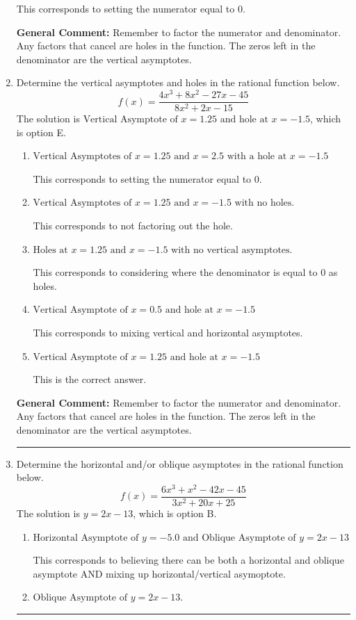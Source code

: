 \documentclass{extbook}[14pt]
\newcommand{\litem}[1]{\item #1

\rule{\textwidth}{0.4pt}}
\begin{document}
\begin{enumerate}
{\begin{enumerate}[label=\Alph*.]
This corresponds to setting the numerator equal to 0.
\end{enumerate}

\textbf{General Comment:} Remember to factor the numerator and denominator. Any factors that cancel are holes in the function. The zeros left in the denominator are the vertical asymptotes.
}
\litem{
Determine the vertical asymptotes and holes in the rational function below.
\[ f(x) = \frac{4x^{3} +8 x^{2} -27 x -45}{8x^{2} +2 x -15} \]The solution is \( \text{Vertical Asymptote of } x = 1.25 \text{ and hole at } x = -1.5 \), which is option E.\begin{enumerate}[label=\Alph*.]
\item \( \text{Vertical Asymptotes of } x = 1.25 \text{ and } x = 2.5 \text{ with a hole at } x = -1.5 \)

This corresponds to setting the numerator equal to 0.
\item \( \text{Vertical Asymptotes of } x = 1.25 \text{ and } x = -1.5 \text{ with no holes.} \)

This corresponds to not factoring out the hole.
\item \( \text{Holes at } x = 1.25 \text{ and } x = -1.5 \text{ with no vertical asymptotes.} \)

This corresponds to considering where the denominator is equal to 0 as holes.
\item \( \text{Vertical Asymptote of } x = 0.5 \text{ and hole at } x = -1.5 \)

This corresponds to mixing vertical and horizontal asymptotes.
\item \( \text{Vertical Asymptote of } x = 1.25 \text{ and hole at } x = -1.5 \)

This is the correct answer.
\end{enumerate}

\textbf{General Comment:} Remember to factor the numerator and denominator. Any factors that cancel are holes in the function. The zeros left in the denominator are the vertical asymptotes.
}
\litem{
Determine the horizontal and/or oblique asymptotes in the rational function below.
\[ f(x) = \frac{6x^{3} + x^{2} -42 x -45}{3x^{2} +20 x + 25} \]The solution is \( y = 2x -13 \), which is option B.\begin{enumerate}[label=\Alph*.]
\item \( \text{Horizontal Asymptote of } y = -5.0 \text{ and Oblique Asymptote of } y = 2x -13 \)

This corresponds to believing there can be both a horizontal and oblique asymptote AND mixing up horizontal/vertical asymoptote.
\item \( \text{Oblique Asymptote of } y = 2x -13. \)


\end{enumerate}}
\end{enumerate}
\end{document}

